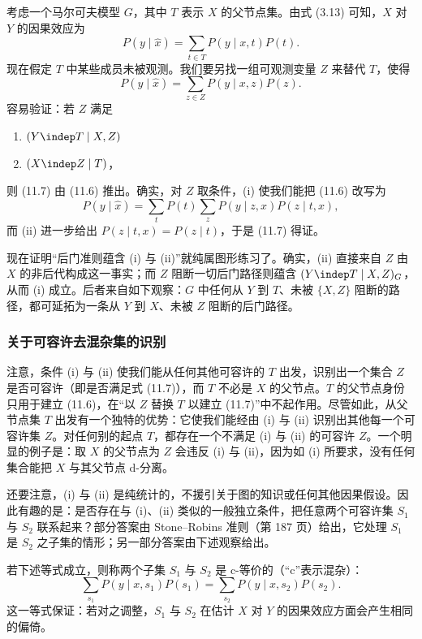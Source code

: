 考虑一个马尔可夫模型 $G$，其中 $T$ 表示 $X$ 的父节点集。由式 (3.13) 可知，$X$ 对 $Y$ 的因果效应为
\begin{equation}
P(y\mid\hat{x})=\sum_{t\in T}P(y\mid x,t)P(t). \tag{11.6}
\end{equation}
现在假定 $T$ 中某些成员未被观测。我们要另找一组可观测变量 $Z$ 来替代 $T$，使得
\begin{equation}
P(y\mid\hat{x})=\sum_{z\in Z}P(y\mid x,z)P(z). \tag{11.7}
\end{equation}
容易验证：若 $Z$ 满足
\begin{enumerate}[label=(\roman*)]
\item $(Y\indep T\mid X,Z)$
\item $(X\indep Z\mid T)$，
\end{enumerate}
则 (11.7) 由 (11.6) 推出。确实，对 $Z$ 取条件，(i) 使我们能把 (11.6) 改写为
\[
P(y\mid\hat{x})=\sum_{t}P(t)\sum_{z}P(y\mid z,x)P(z\mid t,x),
\]
而 (ii) 进一步给出 $P(z\mid t,x)=P(z\mid t)$，于是 (11.7) 得证。

现在证明“后门准则蕴含 (i) 与 (ii)”就纯属图形练习了。确实，(ii) 直接来自 $Z$ 由 $X$ 的非后代构成这一事实；而 $Z$ 阻断一切后门路径则蕴含 $(Y\indep T\mid X,Z)_G$，从而 (i) 成立。后者来自如下观察：$G$ 中任何从 $Y$ 到 $T$、未被 $\{X,Z\}$ 阻断的路径，都可延拓为一条从 $Y$ 到 $X$、未被 $Z$ 阻断的后门路径。

\subsubsection*{关于可容许去混杂集的识别}

注意，条件 (i) 与 (ii) 使我们能从任何其他可容许的 $T$ 出发，识别出一个集合 $Z$ 是否可容许（即是否满足式 (11.7)），而 $T$ 不必是 $X$ 的父节点。$T$ 的父节点身份只用于建立 (11.6)，在“以 $Z$ 替换 $T$ 以建立 (11.7)”中不起作用。尽管如此，从父节点集 $T$ 出发有一个独特的优势：它使我们能经由 (i) 与 (ii) 识别出其他每一个可容许集 $Z$。对任何别的起点 $T$，都存在一个不满足 (i) 与 (ii) 的可容许 $Z$。一个明显的例子是：取 $X$ 的父节点为 $Z$ 会违反 (i) 与 (ii)，因为如 (i) 所要求，没有任何集合能把 $X$ 与其父节点 d-分离。

还要注意，(i) 与 (ii) 是纯统计的，不援引关于图的知识或任何其他因果假设。因此有趣的是：是否存在与 (i)、(ii) 类似的一般独立条件，把任意两个可容许集 $S_1$ 与 $S_2$ 联系起来？部分答案由 Stone–Robins 准则（第 187 页）给出，它处理 $S_1$ 是 $S_2$ 之子集的情形；另一部分答案由下述观察给出。

若下述等式成立，则称两个子集 $S_1$ 与 $S_2$ 是 c-等价的（“c”表示混杂）：
\begin{equation}
\sum_{s_1}P(y\mid x,s_1)P(s_1)=\sum_{s_2}P(y\mid x,s_2)P(s_2). \tag{11.8}
\end{equation}
这一等式保证：若对之调整，$S_1$ 与 $S_2$ 在估计 $X$ 对 $Y$ 的因果效应方面会产生相同的偏倚。

